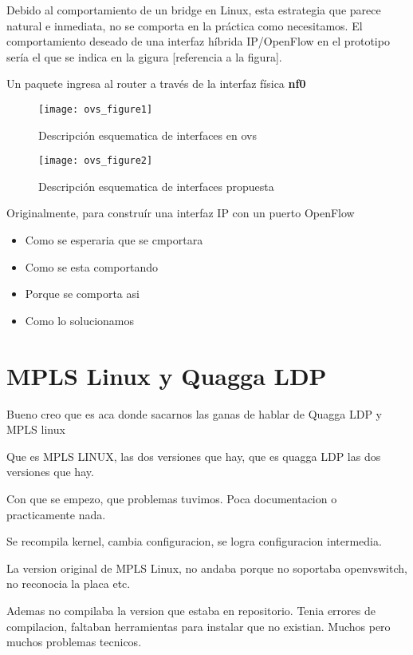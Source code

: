 \begin{enumerate}
Debido al comportamiento de un bridge en Linux, esta estrategia que parece natural e inmediata, no se comporta en la pr\'actica como necesitamos. El comportamiento deseado de una interfaz h\'ibrida IP/OpenFlow en el prototipo ser\'ia el que se indica en la gigura [referencia a la figura].

Un paquete ingresa al router a trav\'es de la interfaz f\'isica \textbf{nf0}

\newpage
\begin{figure}[htbp!] 
\centering    
\texttt{[image: ovs\_figure1]}
\caption[OVSInterfaces1]{Descripci\'on esquematica de interfaces en ovs}
\label{fig:OVSInterfaces1}
\end{figure}

\begin{figure}[htbp!] 
\centering    
\texttt{[image: ovs\_figure2]}
\caption[OVSInterfaces2]{Descripci\'on esquematica de interfaces propuesta}
\label{fig:OVSInterfaces2}
\end{figure}


Originalmente, para constru\'ir una interfaz IP con un puerto OpenFlow 

\begin{itemize}
\item Como se esperaria que se cmportara
\item Como se esta comportando
\item Porque se comporta asi
\item Como lo solucionamos
\end{itemize}

\end{enumerate}

\section{MPLS Linux y Quagga LDP}
Bueno creo que es aca donde sacarnos las ganas de hablar de Quagga LDP y MPLS linux

Que es MPLS LINUX, las dos versiones que hay, que es quagga LDP las dos versiones que hay.

Con que se empezo, que problemas tuvimos. Poca documentacion o practicamente nada.

Se recompila kernel, cambia configuracion, se logra configuracion intermedia.

La version original de MPLS Linux, no andaba porque no soportaba openvswitch, no reconocia la placa etc.

Ademas no compilaba la version que estaba en repositorio. Tenia errores de compilacion, faltaban herramientas para instalar que no existian. Muchos pero muchos problemas tecnicos.

